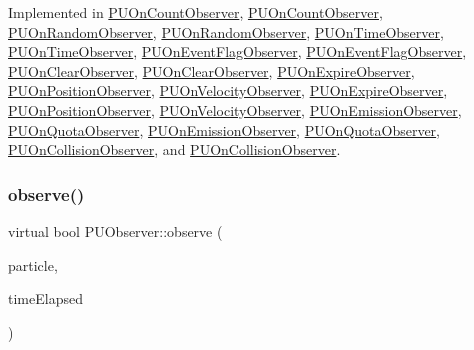 Implemented in \hyperlink{classPUOnCountObserver_ae183110704061276d72a79b3c746677f}{P\+U\+On\+Count\+Observer}, \hyperlink{classPUOnCountObserver_a8f6c4a64fa9fc49264a5cb3430d04c27}{P\+U\+On\+Count\+Observer}, \hyperlink{classPUOnRandomObserver_a00961e9d122d4343ddf9b63c8c0dd720}{P\+U\+On\+Random\+Observer}, \hyperlink{classPUOnRandomObserver_a788e7e6c809434acb224aa15183a9554}{P\+U\+On\+Random\+Observer}, \hyperlink{classPUOnTimeObserver_ae8ec581632549ab8b8cd7e934c17a8b9}{P\+U\+On\+Time\+Observer}, \hyperlink{classPUOnTimeObserver_a15ec72bea8accd66333cd9b50e9683da}{P\+U\+On\+Time\+Observer}, \hyperlink{classPUOnEventFlagObserver_a686b31262aca58e1fd6ae83cdafa809b}{P\+U\+On\+Event\+Flag\+Observer}, \hyperlink{classPUOnEventFlagObserver_acf9852b52ba0a7fcf2ebaf35f3dd64ee}{P\+U\+On\+Event\+Flag\+Observer}, \hyperlink{classPUOnClearObserver_ac6c19fab71428b5c01df6e39955fa7fd}{P\+U\+On\+Clear\+Observer}, \hyperlink{classPUOnClearObserver_a63170ff694bf58c730d63145129b0dc0}{P\+U\+On\+Clear\+Observer}, \hyperlink{classPUOnExpireObserver_ad14849989e86b0d3c24bfab468149b9d}{P\+U\+On\+Expire\+Observer}, \hyperlink{classPUOnPositionObserver_a2c47b5b4b29896c659d4dea79d8360f1}{P\+U\+On\+Position\+Observer}, \hyperlink{classPUOnVelocityObserver_aac0680a7af1e86d54dbf17edc20f83b9}{P\+U\+On\+Velocity\+Observer}, \hyperlink{classPUOnExpireObserver_aaaddff7c0cc6987a1f341437167729af}{P\+U\+On\+Expire\+Observer}, \hyperlink{classPUOnPositionObserver_ab6d9011751d16face64818214a1acd21}{P\+U\+On\+Position\+Observer}, \hyperlink{classPUOnVelocityObserver_a2719478a33935f6cafee11b72b1968bf}{P\+U\+On\+Velocity\+Observer}, \hyperlink{classPUOnEmissionObserver_a943d4b27b5a19b1918a0f7877c5dffb2}{P\+U\+On\+Emission\+Observer}, \hyperlink{classPUOnQuotaObserver_aa0d90169df0c2b2c2cf0d3021c3b674a}{P\+U\+On\+Quota\+Observer}, \hyperlink{classPUOnEmissionObserver_a8e44d09b84802c78a7cbe671a104962c}{P\+U\+On\+Emission\+Observer}, \hyperlink{classPUOnQuotaObserver_a0126f46b5e421c15218697814c5922ff}{P\+U\+On\+Quota\+Observer}, \hyperlink{classPUOnCollisionObserver_a59b536488e3a91560d8e3d730b860185}{P\+U\+On\+Collision\+Observer}, and \hyperlink{classPUOnCollisionObserver_ab3b3d75044d271697792ff7f6d7eff4e}{P\+U\+On\+Collision\+Observer}.

\mbox{\label{classPUObserver_a50f59cc3245e291b641463db5d3037f7}} 
\subsubsection{\texorpdfstring{observe()}{observe()}\hspace{0.1cm}{\footnotesize\ttfamily [2/2]}}
{\footnotesize\ttfamily virtual bool P\+U\+Observer\+::observe (\begin{DoxyParamCaption}\item[{\hyperlink{structPUParticle3D}{P\+U\+Particle3D} $\ast$}]{particle,  }\item[{float}]{time\+Elapsed }\end{DoxyParamCaption})\hspace{0.3cm}{\ttfamily [pure virtual]}}

